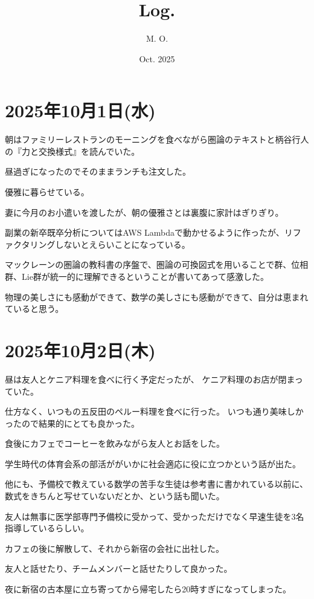\documentclass[uplatex]{jsarticle}
\title{
Log.
}
\author{
M. O.
}
\date{Oct. 2025}
\begin{document}
\maketitle

\section{2025年10月1日(水)}

朝はファミリーレストランのモーニングを食べながら圏論のテキストと柄谷行人の『力と交換様式』を読んでいた。

昼過ぎになったのでそのままランチも注文した。

優雅に暮らせている。

妻に今月のお小遣いを渡したが、朝の優雅さとは裏腹に家計はぎりぎり。

副業の新卒既卒分析についてはAWS Lambdaで動かせるように作ったが、リファクタリングしないとえらいことになっている。

マックレーンの圏論の教科書の序盤で、圏論の可換図式を用いることで群、位相群、Lie群が統一的に理解できるということが書いてあって感激した。

物理の美しさにも感動ができて、数学の美しさにも感動ができて、自分は恵まれていると思う。

\section{2025年10月2日(木)}

昼は友人とケニア料理を食べに行く予定だったが、
ケニア料理のお店が閉まっていた。

仕方なく、いつもの五反田のペルー料理を食べに行った。
いつも通り美味しかったので結果的にとても良かった。

食後にカフェでコーヒーを飲みながら友人とお話をした。

学生時代の体育会系の部活ががいかに社会適応に役に立つかという話が出た。

他にも、予備校で教えている数学の苦手な生徒は参考書に書かれている以前に、数式をきちんと写せていないだとか、という話も聞いた。

友人は無事に医学部専門予備校に受かって、受かっただけでなく早速生徒を3名指導しているらしい。

カフェの後に解散して、それから新宿の会社に出社した。

友人と話せたり、チームメンバーと話せたりして良かった。

夜に新宿の古本屋に立ち寄ってから帰宅したら20時すぎになってしまった。
\end{document}
